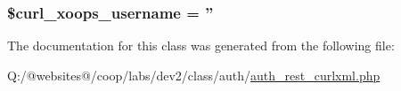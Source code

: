 \hypertarget{class_xortify_auth_rest___curlxml_aab7480ba9f878a02b2c9fd43922fa070}{
\subsubsection[{\$curl\-\_\-xoops\-\_\-username}]{\setlength{\rightskip}{0pt plus 5cm}\$curl\-\_\-xoops\-\_\-username = ''}}\label{class_xortify_auth_rest___curlxml_aab7480ba9f878a02b2c9fd43922fa070}


The documentation for this class was generated from the following file\-:\begin{DoxyCompactItemize}
\item 
Q\-:/@websites@/coop/labs/dev2/class/auth/\hyperlink{auth__rest__curlxml_8php}{auth\-\_\-rest\-\_\-curlxml.\-php}\end{DoxyCompactItemize}
